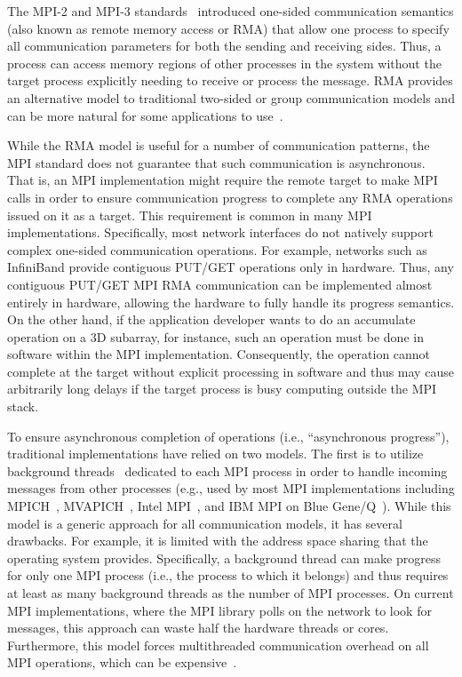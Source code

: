 
The MPI-2 and MPI-3 standards~\cite{mpi30-report} introduced one-sided
communication semantics (also known as remote memory access or RMA)
that allow one process to specify all communication parameters for
both the sending and receiving sides.  Thus, a process can access
memory regions of other processes in the system without the target
process explicitly needing to receive or process the message.  RMA
provides an alternative model to traditional two-sided or group
communication models and can be more natural for some applications to
use~\cite{dinan12:armci_mpi}.

While the RMA model is useful for a number of communication patterns,
the MPI standard does not guarantee that such communication is
asynchronous.  That is, an MPI implementation might require
the remote target to make MPI calls in order to ensure communication
progress to complete any RMA operations issued on it as a target.
This requirement is common in many MPI implementations.
Specifically, most network interfaces do not natively support complex
one-sided communication operations.  For example, networks such as
InfiniBand provide contiguous PUT\slash GET operations only in
hardware.  Thus, any contiguous PUT\slash GET MPI RMA communication
can be implemented almost entirely in hardware, allowing the hardware
to fully handle its progress semantics.  On the other hand, if the
application developer wants to do an accumulate operation on a 3D
subarray, for instance, such an operation must be done in software
within the MPI implementation.  Consequently, the operation cannot
complete at the target without explicit processing in software and
thus may cause arbitrarily long delays if the target process is busy
computing outside the MPI stack.

To ensure asynchronous completion of operations (i.e., ``asynchronous
progress''), traditional implementations have relied on two models.
The first is to utilize background threads~\cite{mpi2-thread}
dedicated to each MPI process in order to handle incoming messages
from other processes (e.g., used by most MPI implementations including
MPICH~\cite{mpich}, MVAPICH~\cite{mvapich}, Intel MPI~\cite{intelmpi},
and IBM MPI on Blue Gene/Q~\cite{bgq-mpi}). While this model is a
generic approach for all communication models, it has several drawbacks.
For example, it is limited with the address space sharing that the operating system
provides.  Specifically, a background thread can make progress
for only one MPI process (i.e., the process to which it belongs) and thus
requires at least as many background threads as the number of MPI
processes.  On current MPI implementations, where the MPI library
polls on the network to look for messages, this approach can waste half the
hardware threads or cores.  Furthermore, this model forces
multithreaded communication overhead on all MPI operations, which can
be expensive~\cite{thread-safety}.

